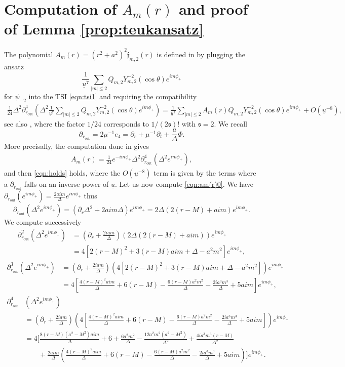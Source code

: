 \documentclass[reqno]{amsart}
\numberwithin{equation}{section}
\newcommand{\ubar}{{\underline{u}}}
\newcommand{\psim}{\psi_{-2}}
\newcommand{\sfrak}{2}
\newcommand{\ansatzm}{\frac{1}{\ubar^7}\sum_{|m|\leq2}Q_{m,\sfrak}Y_{m,\sfrak}^{-\sfrak}(\cos\theta)e^{im\phi_{+}}}
\newcommand{\exptruc}{e^{im\phi_{+}}}
\theoremstyle{plain}
\theoremstyle{definition}
\theoremstyle{remark}
\numberwithin{equation}{section}
\begin{document}
\section{Computation of $A_m(r)$ and proof of Lemma \ref{prop:teukansatz}}\label{appendix:am(r)}
The polynomial $A_m(r)=(r^2+a^2)^2\mathfrak{f}_{m,2}(r)$ is defined in \cite[Eq. (5.82c)]{pricelaw} by plugging the ansatz 
$$\ansatzm$$
for $\psim$ into the TSI \eqref{eqn:tsi1} and requiring the compatibility
\begin{align}\label{eqn:holds}
    \frac{1}{24}\Delta^2\partial_{r_\mathrm{out}}^4\left(\Delta^2\ansatzm\right)=\frac{1}{\ubar^7}\sum_{|m|\leq 2}A_m(r)Q_{m,2}Y_{m,2}^{-2}(\cos\theta)e^{im\phi_{+}}+O(\ubar^{-8}),
\end{align}
see also \cite[Eq. (5.88), (5.89)]{pricelaw}, where the factor $1/24$ corresponds to $1/(2\mathfrak{s})!$ with $\mathfrak{s}=2$. We recall
$$\partial_{r_\mathrm{out}}=2\mu^{-1}e_4=\partial_r+\mu^{-1}\partial_t+\frac{a}{\Delta}\Phi.$$
More precisally, the computation done in \cite[p. 68,  eq. (5.88)]{pricelaw} gives
\begin{align}\label{eqn:am(r)0}
    A_m(r)=\frac{1}{24}e^{-im\phi_{+}}\Delta^2\partial_{r_\mathrm{out}}^4(\Delta^2e^{im\phi_{+}}),
\end{align}
and then \eqref{eqn:holds} holds, where the $O(\ubar^{-8})$ term is given by the terms where a $\partial_{r_\mathrm{out}}$ falls on an inverse power of $\ubar$. Let us now compute \eqref{eqn:am(r)0}. We have $\partial_{r_\mathrm{out}}(e^{im\phi_{+}})=\frac{2aim}{\Delta}e^{im\phi_{+}}$ thus 
$$\partial_{r_\mathrm{out}}(\Delta^2e^{im\phi_{+}})=(\partial_r\Delta^2+2aim\Delta)\exptruc=2\Delta(2(r-M)+aim)\exptruc.$$
We compute successively
\begin{align*}
    \partial_{r_\mathrm{out}}^2(\Delta^2e^{im\phi_{+}})&=\left(\partial_r+\frac{2iam}{\Delta}\right)(2\Delta(2(r-M)+aim))\exptruc\\
    &=4[2(r-M)^2+3(r-M)aim+\Delta-a^2m^2]\exptruc,
\end{align*}
\begin{align*}
    \partial_{r_\mathrm{out}}^3(\Delta^2e^{im\phi_{+}})&=\left(\partial_r+\frac{2iam}{\Delta}\right)(4[2(r-M)^2+3(r-M)aim+\Delta-a^2m^2])\exptruc\\
    &=4\left[\frac{4(r-M)^2aim}{\Delta}+6(r-M)-\frac{6(r-M)a^2m^2}{\Delta}-\frac{2ia^3m^3}{\Delta}+5aim\right]\exptruc,
\end{align*}
\begin{align*}
    \partial_{r_\mathrm{out}}^4&(\Delta^2e^{im\phi_{+}})\\
    &=\left(\partial_r+\frac{2iam}{\Delta}\right)\left(4\left[\frac{4(r-M)^2aim}{\Delta}+6(r-M)-\frac{6(r-M)a^2m^2}{\Delta}-\frac{2ia^3m^3}{\Delta}+5aim\right]\right)\exptruc\\
    &=4\Bigg[\frac{8(r-M)(a^2-M^2)aim}{\Delta}+6+\frac{6a^2m^2}{\Delta}-\frac{12a^2m^2(a^2-M^2)}{\Delta^2}+\frac{4ia^3m^3(r-M)}{\Delta^2}\\
    &\quad\quad+\frac{2aim}{\Delta}\left(\frac{4(r-M)^2aim}{\Delta}+6(r-M)-\frac{6(r-M)a^2m^2}{\Delta}-\frac{2ia^3m^3}{\Delta}+5aim\right)\Bigg]\exptruc.
\end{align*}
\end{document}
